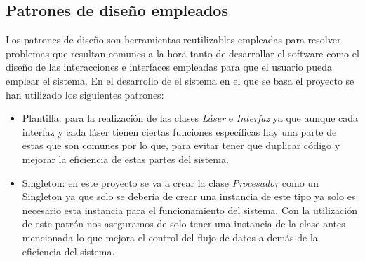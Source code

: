 \subsection{Patrones de diseño empleados}

Los patrones de diseño son herramientas reutilizables empleadas para resolver problemas que resultan comunes a la hora tanto de desarrollar el software como el diseño de las interacciones e interfaces empleadas para que el usuario pueda emplear el sistema.\hfill
\break\break
En el desarrollo de el sistema en el que se basa el proyecto se han utilizado los siguientes patrones:
\begin{itemize}
    \item Plantilla: para la realización de las clases \textit{Láser} e \textit{Interfaz} ya que aunque cada interfaz y cada láser tienen ciertas funciones específicas hay una parte de estas que son comunes por lo que, para evitar tener que duplicar código y mejorar la eficiencia de estas partes del sistema.\hfill
\break
    \item Singleton: en este proyecto se va a crear la clase \textit{Procesador} como un Singleton ya que solo se debería de crear una instancia de este tipo ya solo es necesario esta instancia para el funcionamiento del  sistema. Con la utilización de este patrón nos aseguramos de solo tener una instancia de la clase antes mencionada lo que mejora el control del flujo de datos a demás de la eficiencia del sistema.\hfill
    \break
\end{itemize}